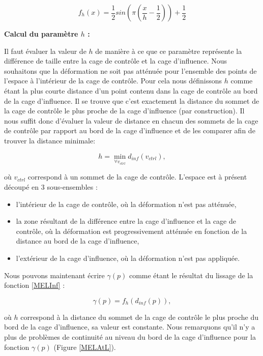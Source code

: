 \begin{equation}
  f_h(x) = \frac{1}{2} sin(\pi(\frac{x}{h} - \frac{1}{2})) + \frac{1}{2}
\end{equation}

\textbf{Calcul du paramètre $h$ :}

Il faut évaluer la valeur de $h$ de manière à ce que ce paramètre représente
la différence de taille entre la cage de contrôle et la cage d'influence. Nous
souhaitons que la déformation ne soit pas atténuée pour l'ensemble des points
de l'espace à l'intérieur de la cage de contrôle. Pour cela nous définissons
$h$ comme étant la plus courte distance d'un point contenu dans la cage de
contrôle au bord de la cage d'influence. Il se trouve que c'est exactement la
distance du sommet de la cage de contrôle le plus proche de la cage
d'influence (par construction). Il nous suffit donc d'évaluer la valeur de
distance en chacun des sommets de la cage de contrôle par rapport au bord de
la cage d'influence et de les comparer afin de trouver la distance minimale:

\begin{equation}
  h = \min_{\forall v_{ctrl}} d_{inf}(v_{ctrl}),
\end{equation}

où $v_{ctrl}$ correspond à un sommet de la cage de contrôle. L'espace est à
présent découpé en 3 sous-ensembles : 

\begin{itemize}

\item l'intérieur de la cage de contrôle, où la déformation n'est pas atténuée,

\item la zone résultant de la différence entre la cage d'influence et la cage
de contrôle, où la déformation est progressivement atténuée en fonction de la
distance au bord de la cage d'influence,

\item l'extérieur de la cage d'influence, où la déformation n'est pas
appliquée.

\end{itemize}

Nous pouvons maintenant écrire $\gamma(p)$ comme étant le résultat du lissage
de la fonction \ref{MELInf} :

\begin{equation}
  \gamma(p) = f_h(d_{inf}(p)),
\end{equation}

où $h$ correspond à la distance du sommet de la cage de contrôle le plus
proche du bord de la cage d'influence, sa valeur est constante. Nous
remarquons qu'il n'y a plus de problèmes de continuité au niveau du bord de la
cage d'influence pour la fonction $\gamma(p)$ (Figure \ref{MELAtL}).

